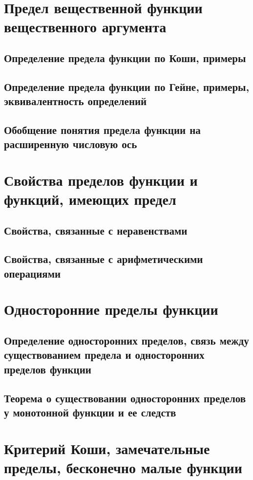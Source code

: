\section{Предел вещественной функции вещественного аргумента}
\subsection{Определение предела функции по Коши, примеры}
\subsection{Определение предела функции по Гейне, примеры, эквивалентность определений}
\subsection{Обобщение понятия предела функции на расширенную числовую ось}

\section{Свойства пределов функции и функций, имеющих предел}
\subsection{Свойства, связанные с неравенствами}
\subsection{Свойства, связанные с арифметическими  операциями}

\section{Односторонние пределы функции}
\subsection{Определение односторонних пределов, связь между существованием предела и односторонних пределов функции}
\subsection{Теорема о существовании односторонних пределов у монотонной функции и ее следств}

\section{Критерий Коши, замечательные пределы, бесконечно малые функции}

